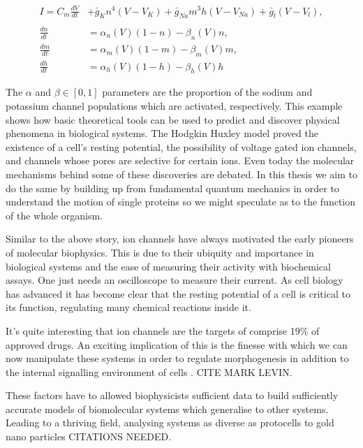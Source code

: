 \begin{equation}
\begin{aligned}
	I = C_m \frac{dV}{dt} &+ \bar{g}_K n^4 (V - V_K) + \bar{g}_{Na} m^3 h (V - V_{Na} ) + \bar{g}_l (V-V_l) ,  \\ \\
	\frac{dn}{dt} &= \alpha_n(V)  (1-n) - \beta_n(V)  n, \\
	\frac{dm}{dt} &= \alpha_m(V)  (1-m) - \beta_m(V)  m, \\ 
	\frac{dh}{dt} &= \alpha_h(V)  (1-h) - \beta_h(V)  h  
\end{aligned}
\end{equation}

The $\alpha$ and $\beta \in [0,1]$ parameters are the proportion of the sodium and potassium channel populations which are activated, respectively.  This example shows how basic theoretical tools can be used to predict and discover physical phenomena in biological systems. The Hodgkin Huxley model proved the existence of a cell's resting potential, the possibility of voltage gated ion channels, and channels whose pores are selective for certain ions. Even today the molecular mechanisms behind some of these discoveries are debated. In this thesis we aim to do the same by building up from fundamental quantum mechanics in order to understand the motion of single proteins so we might speculate as to the function of the whole organism.

Similar to the above story, ion channels have always motivated the early pioneers of molecular biophysics. This is due to their ubiquity and importance in biological systems and the ease of measuring their activity with biochemical assays. One just needs an oscilloscope to measure their current. As cell biology has advanced it has become clear that the resting potential of a cell is critical to its function, regulating many chemical reactions inside it.

It's quite interesting that ion channels are the targets of comprise 19\% of approved drugs.\cite{santos2017} An exciting implication of this is the finesse with which we can now manipulate these systems in order to regulate morphogenesis in addition to the internal signalling environment of cells \cite{}. CITE MARK LEVIN.

These factors have to allowed biophysicists sufficient data to build sufficiently accurate models of biomolecular systems which generalise to other systems. Leading to a thriving field, analysing systems as diverse as protocells to gold nano particles CITATIONS NEEDED.


